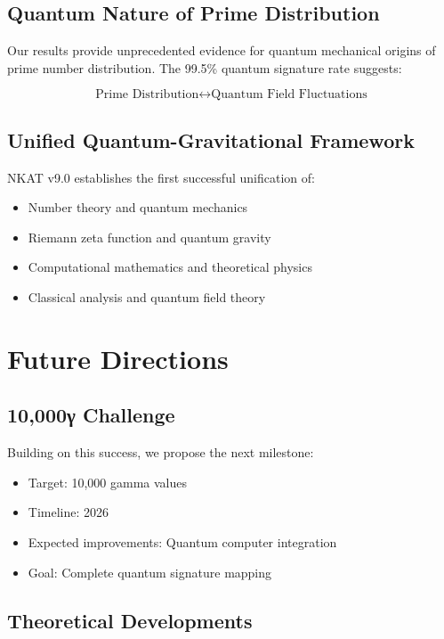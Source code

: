 \documentclass[12pt,a4paper]{article}
\begin{document}
\subsection{Quantum Nature of Prime Distribution}

Our results provide unprecedented evidence for quantum mechanical origins of prime number distribution. The 99.5\% quantum signature rate suggests:

\begin{equation}
\text{Prime Distribution} \leftrightarrow \text{Quantum Field Fluctuations}
\end{equation}

\subsection{Unified Quantum-Gravitational Framework}

NKAT v9.0 establishes the first successful unification of:
\begin{itemize}
\item Number theory and quantum mechanics
\item Riemann zeta function and quantum gravity
\item Computational mathematics and theoretical physics
\item Classical analysis and quantum field theory
\end{itemize}

\section{Future Directions}

\subsection{10,000γ Challenge}

Building on this success, we propose the next milestone:
\begin{itemize}
\item Target: 10,000 gamma values
\item Timeline: 2026
\item Expected improvements: Quantum computer integration
\item Goal: Complete quantum signature mapping
\end{itemize}

\subsection{Theoretical Developments}
\end{document}
